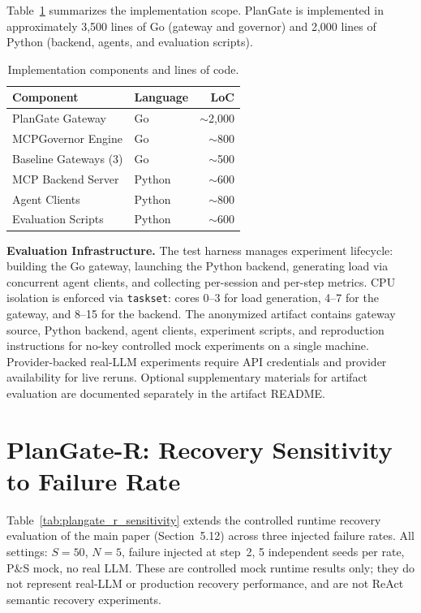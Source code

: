 \documentclass[sigconf,anonymous]{acmart}
\begin{document}
Table~\ref{tab:impl} summarizes the implementation scope. PlanGate is implemented in approximately 3,500 lines of Go (gateway and governor) and 2,000 lines of Python (backend, agents, and evaluation scripts).

\begin{table}[h]
\caption{Implementation components and lines of code.}
\label{tab:impl}
\small
\begin{tabular}{@{}llr@{}}
\toprule
\textbf{Component} & \textbf{Language} & \textbf{LoC} \\
\midrule
PlanGate Gateway & Go & $\sim$2,000 \\
MCPGovernor Engine & Go & $\sim$800 \\
Baseline Gateways (3) & Go & $\sim$500 \\
MCP Backend Server & Python & $\sim$600 \\
Agent Clients & Python & $\sim$800 \\
Evaluation Scripts & Python & $\sim$600 \\
\bottomrule
\end{tabular}
\end{table}

\textbf{Evaluation Infrastructure.} The test harness manages experiment lifecycle: building the Go gateway, launching the Python backend, generating load via concurrent agent clients, and collecting per-session and per-step metrics. CPU isolation is enforced via \texttt{taskset}: cores 0--3 for load generation, 4--7 for the gateway, and 8--15 for the backend. The anonymized artifact contains gateway source, Python backend, agent clients, experiment scripts, and reproduction instructions for no-key controlled mock experiments on a single machine. Provider-backed real-LLM experiments require API credentials and provider availability for live reruns. Optional supplementary materials for artifact evaluation are documented separately in the artifact README.

\section{PlanGate-R: Recovery Sensitivity to Failure Rate}
\label{sec:recovery-appendix}

Table~\ref{tab:plangate_r_sensitivity} extends the controlled runtime recovery evaluation of the main paper (Section~5.12) across three injected failure rates.
All settings: $S{=}50$, $N{=}5$, failure injected at step~2, 5 independent seeds per rate, P\&S mock, no real LLM.
These are controlled mock runtime results only; they do not represent real-LLM or production recovery performance, and are not ReAct semantic recovery experiments.
\end{document}
